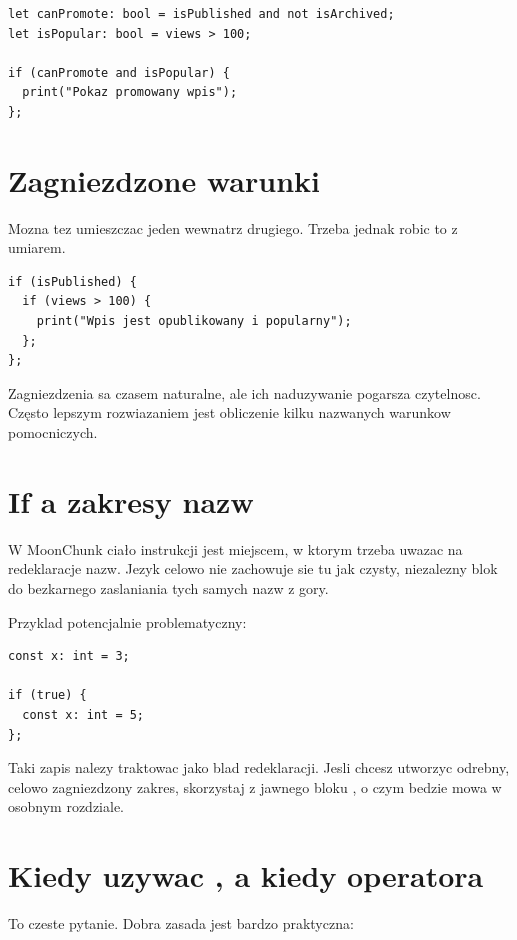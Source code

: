 \begin{lstlisting}[style=moonchunk,caption={Podzial zlozonego warunku na kroki}]
let canPromote: bool = isPublished and not isArchived;
let isPopular: bool = views > 100;

if (canPromote and isPopular) {
  print("Pokaz promowany wpis");
};
\end{lstlisting}

\section{Zagniezdzone warunki}
Mozna tez umieszczac jeden  wewnatrz drugiego. Trzeba jednak robic to z umiarem.

\begin{lstlisting}[style=moonchunk,caption={Zagniezdzone warunki}]
if (isPublished) {
  if (views > 100) {
    print("Wpis jest opublikowany i popularny");
  };
};
\end{lstlisting}

Zagniezdzenia sa czasem naturalne, ale ich naduzywanie pogarsza czytelnosc. Często
lepszym rozwiazaniem jest obliczenie kilku nazwanych warunkow pomocniczych.

\section{If a zakresy nazw}
W MoonChunk ciało instrukcji  jest miejscem, w ktorym trzeba uwazac na redeklaracje
nazw. Jezyk celowo nie zachowuje sie tu jak czysty, niezalezny blok do bezkarnego
zaslaniania tych samych nazw z gory.

Przyklad potencjalnie problematyczny:

\begin{lstlisting}[style=moonchunk,caption={Redeclaracja w ciele if}]
const x: int = 3;

if (true) {
  const x: int = 5;
};
\end{lstlisting}

Taki zapis nalezy traktowac jako blad redeklaracji. Jesli chcesz utworzyc odrebny,
celowo zagniezdzony zakres, skorzystaj z jawnego bloku , o czym bedzie
mowa w osobnym rozdziale.

\section{Kiedy uzywac , a kiedy operatora }
To czeste pytanie. Dobra zasada jest bardzo praktyczna:

